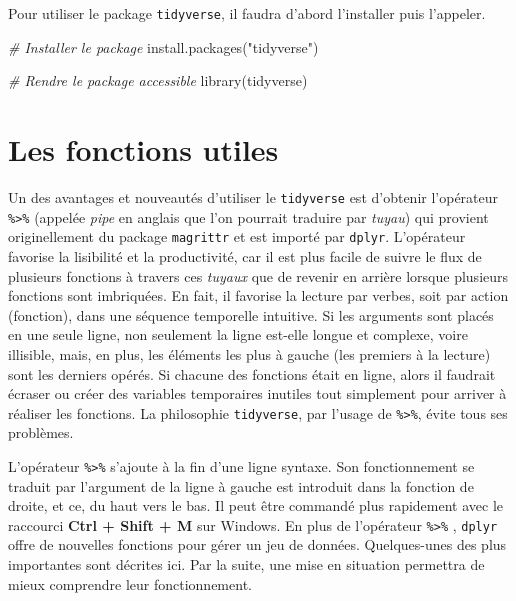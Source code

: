 \documentclass[
]{book}
\newenvironment{Shaded}{}{}
\newcommand{\CommentTok}[1]{\textit{#1}}
\newcommand{\FunctionTok}[1]{#1}
\newcommand{\NormalTok}[1]{#1}
\newcommand{\StringTok}[1]{#1}
\begin{document}
Pour utiliser le package \texttt{tidyverse}, il faudra d'abord l'installer puis l'appeler.

\begin{Shaded}
\begin{Highlighting}[]
\CommentTok{\# Installer le package}
\FunctionTok{install.packages}\NormalTok{(}\StringTok{"tidyverse"}\NormalTok{)}

\CommentTok{\# Rendre le package accessible}
\FunctionTok{library}\NormalTok{(tidyverse)}
\end{Highlighting}
\end{Shaded}

\hypertarget{les-fonctions-utiles}{%
\section{Les fonctions utiles}\label{les-fonctions-utiles}}

Un des avantages et nouveautés d'utiliser le \texttt{tidyverse} est d'obtenir l'opérateur \texttt{\%\textgreater{}\%} (appelée \emph{pipe} en anglais que l'on pourrait traduire par \emph{tuyau}) qui provient originellement du package \texttt{magrittr} \autocite{magri} et est importé par \texttt{dplyr}. L'opérateur favorise la lisibilité et la productivité, car il est plus facile de suivre le flux de plusieurs fonctions à travers ces \emph{tuyaux} que de revenir en arrière lorsque plusieurs fonctions sont imbriquées. En fait, il favorise la lecture par verbes, soit par action (fonction), dans une séquence temporelle intuitive. Si les arguments sont placés en une seule ligne, non seulement la ligne est-elle longue et complexe, voire illisible, mais, en plus, les éléments les plus à gauche (les premiers à la lecture) sont les derniers opérés. Si chacune des fonctions était en ligne, alors il faudrait écraser ou créer des variables temporaires inutiles tout simplement pour arriver à réaliser les fonctions. La philosophie \texttt{tidyverse}, par l'usage de \texttt{\%\textgreater{}\%}, évite tous ses problèmes.

L'opérateur \texttt{\%\textgreater{}\%} s'ajoute à la fin d'une ligne syntaxe. Son fonctionnement se traduit par l'argument de la ligne à gauche est introduit dans la fonction de droite, et ce, du haut vers le bas. Il peut être commandé plus rapidement avec le raccourci \textbf{Ctrl + Shift + M} sur Windows. En plus de l'opérateur \texttt{\%\textgreater{}\%} , \texttt{dplyr} offre de nouvelles fonctions pour gérer un jeu de données. Quelques-unes des plus importantes sont décrites ici. Par la suite, une mise en situation permettra de mieux comprendre leur fonctionnement.
\end{document}
